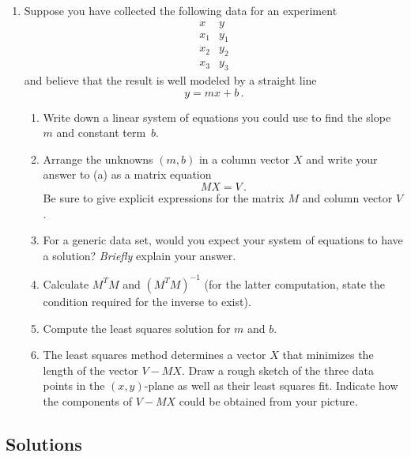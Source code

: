 \begin{enumerate}
\item Suppose you have collected the following data for an experiment
\[
\begin{array}{l|l}
x&y\\\hline
x_1&y_1\\
x_2&y_2\\
x_3&y_3
\end{array}
\]
and believe that the result is well modeled by a straight line
\[
y=mx+b\, .
\]
\begin{enumerate}
\item Write down a linear system of equations you could use to find the slope $m$ and constant term~$b$. 
\item Arrange the unknowns $(m,b)$ in a column vector $X$ and write your answer to (a) as a matrix equation \[M X= V\, .\]
Be sure to give explicit expressions for the matrix $M$ and column vector $V$.
\item For a generic data set, would you expect your system of equations to have a solution? {\itshape Briefly} explain your answer.
\item Calculate $M^T M$ and $(M^T M)^{-1}$ (for the latter computation, state the condition required for the inverse to exist).
\item Compute the least squares solution for $m$ and $b$.
\item The least squares method determines a vector $X$ that minimizes the length of the vector $V-MX$. Draw a rough sketch of
the three data points in the $(x,y)$-plane as well as their least squares fit. 
Indicate how the components of $V-MX$ could be obtained from your picture.

\end{enumerate}

\end{enumerate}

\subsection*{Solutions}

